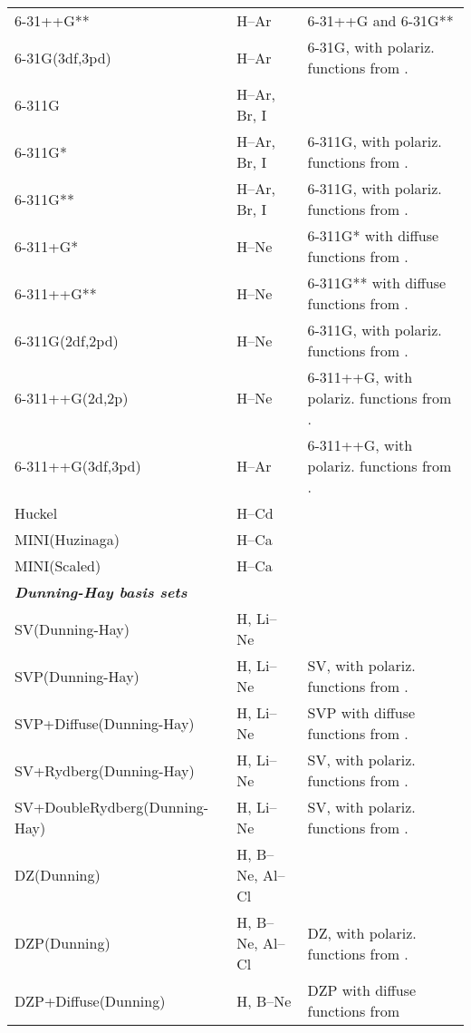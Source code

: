 \begin{longtable}{lll}
6-31++G** & H--Ar & 6-31++G and 6-31G**\\
6-31G(3df,3pd) & H--Ar & 6-31G, with polariz. functions from
  \cite{mjfjapjsbjcp80}.\\
6-311G & H--Ar, Br, I & \cite{rkjsbrsjapjcp72,admgscjcp72,
   lacmpmjpbnedrcblrjcp103,mngapmpmlrjcp103}\\
6-311G* & H--Ar, Br, I & 6-311G, with polariz. functions from
  \cite{rkjsbrsjapjcp72,lacmpmjpbnedrcblrjcp103}.\\
6-311G** & H--Ar, Br, I & 6-311G, with polariz. functions from
  \cite{rkjsbrsjapjcp72,lacmpmjpbnedrcblrjcp103}.\\
6-311+G* & H--Ne & 6-311G* with diffuse functions from 
  \cite{tcjcgwsprsjcc4}.\\
6-311++G** & H--Ne & 6-311G** with diffuse functions from
  \cite{tcjcgwsprsjcc4}.\\
6-311G(2df,2pd) & H--Ne & 6-311G, with polariz. functions from
  \cite{mjfjapjsbjcp80}.\\
6-311++G(2d,2p) & H--Ne & 6-311++G, with polariz. functions from
  \cite{mjfjapjsbjcp80}.\\
6-311++G(3df,3pd) & H--Ar & 6-311++G, with polariz. functions from
  \cite{mjfjapjsbjcp80}.\\
\hline
%
Huckel & H--Cd & \\
MINI(Huzinaga) & H--Ca & \cite{huzinagabasis} \\
MINI(Scaled) & H--Ca & \cite{huzinagabasis,htshjcc1} \\
\hline
%
\bf{\emph{Dunning-Hay basis sets}} & & \\
SV(Dunning-Hay) & H, Li--Ne & \cite{thdpjhhfs1977} \\
SVP(Dunning-Hay) & H, Li--Ne & SV, with polariz. functions from
  \cite{thdpjhhfs1977,emhfsjcp83}.\\
SVP+Diffuse(Dunning-Hay) & H, Li--Ne & SVP with diffuse functions from
  \cite{thdpjhhfs1977,emhfsjcp83}.\\
SV+Rydberg(Dunning-Hay) & H, Li--Ne & SV, with polariz. functions from
  \cite{thdpjhhfs1977-2}.\\
\small{SV+DoubleRydberg(Dunning-Hay)} & H, Li--Ne & SV, with polariz. functions from
  \cite{thdpjhhfs1977-2}.\\
DZ(Dunning) & H, B--Ne, Al--Cl & \cite{thdjcp53,thdpjhhfs1977} \\
DZP(Dunning) & H, B--Ne, Al--Cl & DZ, with polariz. functions from 
  \cite{thdpjhhfs1977,emhfsjcp83}.\\
DZP+Diffuse(Dunning) & H, B--Ne & DZP with diffuse functions from

\end{longtable}
